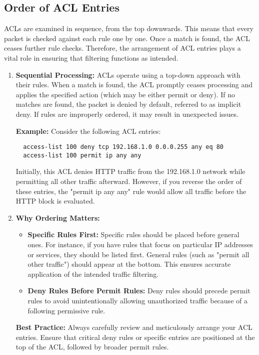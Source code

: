 \documentclass[11pt,a4paper]{article}
\begin{document}
    \subsection*{Order of ACL Entries}
        ACLs are examined in sequence, from the top downwards. This means that every packet is checked against each rule one by one. Once a match is found, the ACL ceases further rule checks. Therefore, the arrangement of ACL entries plays a vital role in ensuring that filtering functions as intended.
        \begin{enumerate}
            \item \textbf{Sequential Processing:} ACLs operate using a top-down approach with their rules. When a match is found, the ACL promptly ceases processing and applies the specified action (which may be either permit or deny). If no matches are found, the packet is denied by default, referred to as implicit deny. If rules are improperly ordered, it may result in unexpected issues.
            
            \textbf{Example:} Consider the following ACL entries:
\begin{lstlisting}
  access-list 100 deny tcp 192.168.1.0 0.0.0.255 any eq 80
  access-list 100 permit ip any any
\end{lstlisting}
            Initially, this ACL denies HTTP traffic from the 192.168.1.0 network while permitting all other traffic afterward. However, if you reverse the order of these entries, the "permit ip any any" rule would allow all traffic before the HTTP block is evaluated.

            \item \textbf{Why Ordering Matters:} 
                \begin{itemize}
                    \item \textbf{Specific Rules First:} Specific rules should be placed before general ones. For instance, if you have rules that focus on particular IP addresses or services, they should be listed first. General rules (such as "permit all other traffic") should appear at the bottom. This ensures accurate application of the intended traffic filtering.
                    \\[1em]
                    \item \textbf{Deny Rules Before Permit Rules:} Deny rules should precede permit rules to avoid unintentionally allowing unauthorized traffic because of a following permissive rule.
                \end{itemize}
                \textbf{Best Practice:} Always carefully review and meticulously arrange your ACL entries. Ensure that critical deny rules or specific entries are positioned at the top of the ACL, followed by broader permit rules.

        \end{enumerate}
\end{document}
